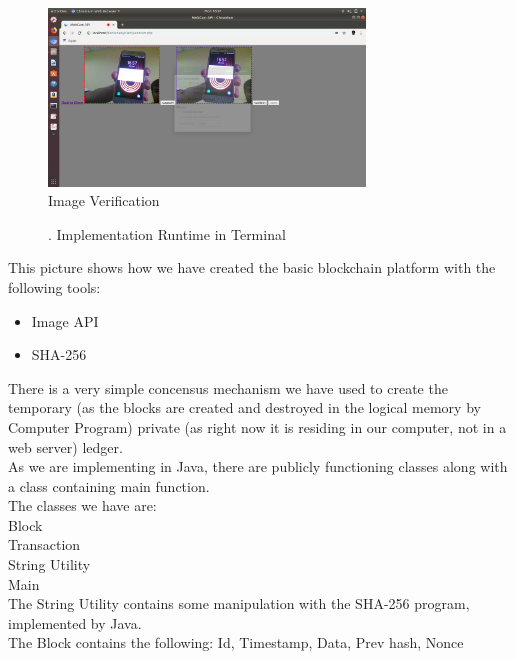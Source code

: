 \begin{figure}
\begin{center}
\includegraphics[width=0.75\textwidth]{./img_src/screen1.png}
\end{center}
\caption{Image Verification}
\end{figure}


\begin{figure}[!htb]
\caption{\label{fig:my-label}. Implementation Runtime in Terminal}
\end{figure}

This picture shows how we have created the basic blockchain platform with the following tools:
\begin{itemize}
\item Image API
\item SHA-256
\end{itemize}
There is a very simple concensus mechanism we have used to create the temporary (as the blocks are created and destroyed in the logical memory by Computer Program) private (as right now it is residing in our computer, not in a web server) ledger.\\

As we are implementing in Java, there are publicly functioning classes along with a class containing main function.\\
The classes we have are:\\
	Block\\
	Transaction\\
	String Utility\\
	Main\\

The String Utility contains some manipulation with the SHA-256 program, implemented by Java.\\

The Block contains the following:
Id, 
Timestamp, 
Data, 
Prev hash, 
Nonce\\

